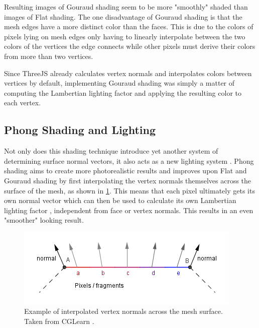 \documentclass[10pt,twocolumn,letterpaper]{article}
\begin{document}
Resulting images of Gouraud shading seem to be more "smoothly" shaded than images of Flat shading. The one disadvantage of Gouraud shading is that the mesh edges have a more distinct color than the faces. This is due to the colors of pixels lying on mesh edges only having to linearly interpolate between the two colors of the vertices the edge connects while other pixels must derive their colors from more than two vertices.

Since ThreeJS already calculates vertex normals and interpolates colors between vertices by default, implementing Gouraud shading was simply a matter of computing the Lambertian lighting factor \cite{wiki:Lambertian_reflectance} and applying the resulting color to each vertex.

\subsection{Phong Shading and Lighting}

Not only does this shading technique introduce yet another system of determining surface normal vectors, it also acts as a new lighting system \cite{cglearn}. Phong shading aims to create more photorealistic results and improves upon Flat and Gouraud shading by first interpolating the vertex normals themselves across the surface of the mesh, as shown in \cref{fig:phong}. This means that each pixel ultimately gets its own normal vector which can then be used to calculate its own Lambertian lighting factor \cite{wiki:Lambertian_reflectance}, independent from face or vertex normals. This results in an even "smoother" looking result.

\begin{figure}[t]
  \centering
  \includegraphics[width=1\linewidth]{phongShading.png}

   \caption{Example of interpolated vertex normals across the mesh surface. Taken from CGLearn \cite{cglearn}.}
   \label{fig:phong}
\end{figure}
\end{document}
